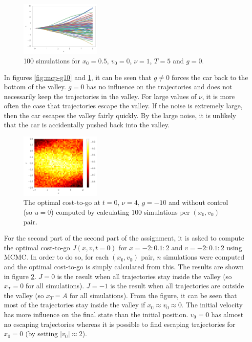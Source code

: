 \documentclass[10pt,a4paper]{article}
\begin{document}
\begin{figure}[h]
\centering
\includegraphics[width=150px]{sim_g0.png}
\caption{100 simulations for $x_0 = 0.5$, $v_0=0$, $\nu=1$, $T=5$ and $g=0$.}
\label{fig:mcp-g0}
\end{figure}

In figures \ref{fig:mcp-g10} and \ref{fig:mcp-g0}, it can be seen that $g \neq 0$ forces the car back to the bottom of the valley. $g=0$ has no influence on the trajectories and does not necessarily keep the trajectories in the valley. For large values of $\nu$, it is more often the case that trajectories escape the valley. If the noise is extremely large, then the car escapes the valley fairly quickly. By the large noise, it is unlikely that the car is accidentally pushed back into the valley.

\begin{figure}[h]
\centering
\includegraphics[width=150px]{J.png}
\caption{The optimal cost-to-go at $t=0$, $\nu=4$, $g=-10$ and without control (so $u=0$) computed by calculating $100$ simulations per $(x_0, v_0)$ pair.}
\label{fig:mcp-j}
\end{figure}

For the second part of the second part of the assignment, it is asked to compute the optimal cost-to-go $J(x, v, t=0)$ for $x=-2:0.1:2$ and $v=-2:0.1:2$ using MCMC. In order to do so, for each $(x_0, v_0)$ pair, $n$ simulations were computed and the optimal cost-to-go is simply calculated from this. The results are shown in figure \ref{fig:mcp-j}. $J=0$ is the result when all trajectories stay inside the valley (so $x_T = 0$ for all simulations). $J=-1$ is the result when all trajectories are outside the valley (so $x_T = A$ for all simulations). From the figure, it can be seen that most of the trajectories stay inside the valley if $x_0 \approx v_0 \approx 0$. The initial velocity has more influence on the final state than the initial position. $v_0=0$ has almost no escaping trajectories whereas it is possible to find escaping trajectories for $x_0=0$ (by setting $|v_0| \approx 2$).
\end{document}
